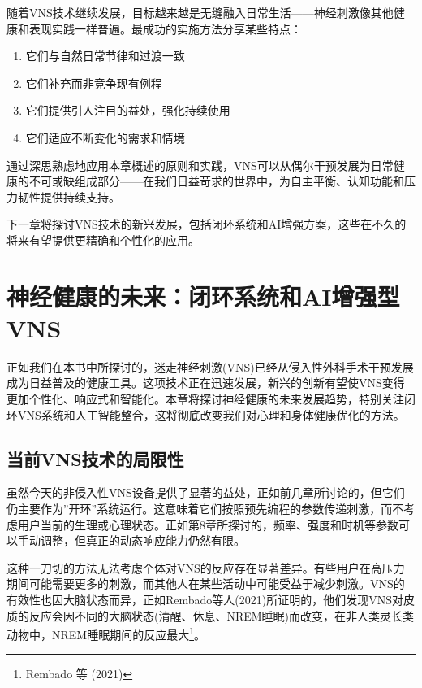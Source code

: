 \documentclass[
  Letterpaper,
]{scrbook}
\providecommand{\tightlist}{%
  \setlength{\itemsep}{0pt}\setlength{\parskip}{0pt}}\usepackage{longtable,booktabs,array}
\begin{document}
随着VNS技术继续发展，目标越来越是无缝融入日常生活------神经刺激像其他健康和表现实践一样普遍。最成功的实施方法分享某些特点：

\begin{enumerate}
\def\labelenumi{\arabic{enumi}.}
\tightlist
\item
  它们与自然日常节律和过渡一致
\item
  它们补充而非竞争现有例程
\item
  它们提供引人注目的益处，强化持续使用
\item
  它们适应不断变化的需求和情境
\end{enumerate}

通过深思熟虑地应用本章概述的原则和实践，VNS可以从偶尔干预发展为日常健康的不可或缺组成部分------在我们日益苛求的世界中，为自主平衡、认知功能和压力韧性提供持续支持。

下一章将探讨VNS技术的新兴发展，包括闭环系统和AI增强方案，这些在不久的将来有望提供更精确和个性化的应用。


\chapter{神经健康的未来：闭环系统和AI增强型VNS}\label{ux795eux7ecfux5065ux5eb7ux7684ux672aux6765ux95edux73afux7cfbux7edfux548caiux589eux5f3aux578bvns}

正如我们在本书中所探讨的，迷走神经刺激(VNS)已经从侵入性外科手术干预发展成为日益普及的健康工具。这项技术正在迅速发展，新兴的创新有望使VNS变得更加个性化、响应式和智能化。本章将探讨神经健康的未来发展趋势，特别关注闭环VNS系统和人工智能整合，这将彻底改变我们对心理和身体健康优化的方法。

\section{当前VNS技术的局限性}\label{ux5f53ux524dvnsux6280ux672fux7684ux5c40ux9650ux6027}

虽然今天的非侵入性VNS设备提供了显著的益处，正如前几章所讨论的，但它们仍主要作为''开环''系统运行。这意味着它们按照预先编程的参数传递刺激，而不考虑用户当前的生理或心理状态。正如第8章所探讨的，频率、强度和时机等参数可以手动调整，但真正的动态响应能力仍然有限。

这种一刀切的方法无法考虑个体对VNS的反应存在显著差异。有些用户在高压力期间可能需要更多的刺激，而其他人在某些活动中可能受益于减少刺激。VNS的有效性也因大脑状态而异，正如Rembado等人(2021)所证明的，他们发现VNS对皮质的反应会因不同的大脑状态(清醒、休息、NREM睡眠)而改变，在非人类灵长类动物中，NREM睡眠期间的反应最大\footnote{Rembado
  等 (2021)}。
\end{document}
